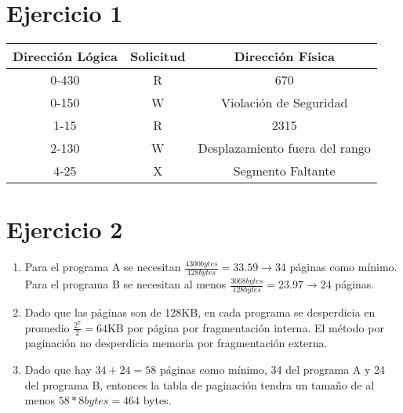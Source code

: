 \documentclass[12pt]{article}
\begin{document}
	\section*{Ejercicio 1}
	\begin{Large}
	\begin{center}
		\begin{tabular}{ c | c | c }
			\textbf{Dirección Lógica} & \textbf{Solicitud} & \textbf{Dirección Física} \\ \hline
			0-430 & R & 670 \\ 
			0-150 & W & Violación de Seguridad \\
			1-15 & R & 2315 \\
			2-130 & W & Desplazamiento fuera del rango \\
			4-25 & X & Segmento Faltante \\
		\end{tabular}
	\end{center}
	\end{Large}
	\section*{Ejercicio 2}
	\begin{enumerate}[label=\alph*)]
		\item Para el programa A se necesitan $\frac{4300 bytes}{128 bytes} = 33.59 \rightarrow 34$ páginas como mínimo. Para el programa B se necesitan al menos $\frac{3068 bytes}{128 bytes} = 23.97 \rightarrow 24$ páginas.
		\item Dado que las páginas son de 128KB, en cada programa se desperdicia en promedio $\frac{2^{7}}{2}= 64$KB por página por fragmentación interna. El método por paginación no desperdicia memoria por fragmentación externa.
		\item Dado que hay $34 + 24 = 58$ páginas como mínimo, 34 del programa A y 24 del programa B, entonces la tabla de paginación tendra un tamaño de al menos $58 * 8 bytes = 464$ bytes.
	\end{enumerate}
\end{document}
